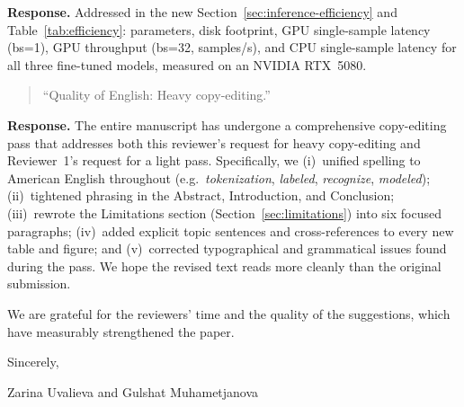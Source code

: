 \documentclass[manuscript, review]{acmart}
\begin{document}
\noindent\textbf{Response.} Addressed in the new Section~\ref{sec:inference-efficiency} and Table~\ref{tab:efficiency}: parameters, disk footprint, GPU single-sample latency (bs=1), GPU throughput (bs=32, samples/s), and CPU single-sample latency for all three fine-tuned models, measured on an NVIDIA RTX~5080.

\begin{quote}
``Quality of English: Heavy copy-editing.''
\end{quote}

\noindent\textbf{Response.} The entire manuscript has undergone a comprehensive copy-editing pass that addresses both this reviewer's request for heavy copy-editing and Reviewer~1's request for a light pass. Specifically, we (i)~unified spelling to American English throughout (e.g.\ \emph{tokenization}, \emph{labeled}, \emph{recognize}, \emph{modeled}); (ii)~tightened phrasing in the Abstract, Introduction, and Conclusion; (iii)~rewrote the Limitations section (Section~\ref{sec:limitations}) into six focused paragraphs; (iv)~added explicit topic sentences and cross-references to every new table and figure; and (v)~corrected typographical and grammatical issues found during the pass. We hope the revised text reads more cleanly than the original submission.

\vspace{1em}
\noindent We are grateful for the reviewers' time and the quality of the suggestions, which have measurably strengthened the paper.

\vspace{1em}
\noindent Sincerely,

\noindent Zarina Uvalieva and Gulshat Muhametjanova
\end{document}

